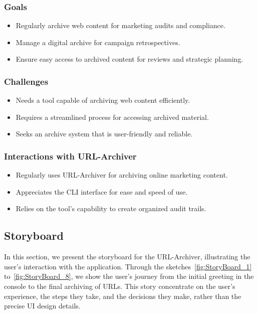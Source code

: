 \subsubsection{Goals}
\begin{itemize}
    \item Regularly archive web content for marketing audits and compliance.
    \item Manage a digital archive for campaign retrospectives.
    \item Ensure easy access to archived content for reviews and strategic planning.
\end{itemize}

\subsubsection{Challenges}
\begin{itemize}
    \item Needs a tool capable of archiving web content efficiently.
    \item Requires a streamlined process for accessing archived material.
    \item Seeks an archive system that is user-friendly and reliable.
\end{itemize}

\subsubsection{Interactions with URL-Archiver}
\begin{itemize}
    \item Regularly uses URL-Archiver for archiving online marketing content.
    \item Appreciates the CLI interface for ease and speed of use.
    \item Relies on the tool's capability to create organized audit trails.
\end{itemize}


\subsection{Storyboard}
In this section, we present the storyboard for the URL-Archiver, illustrating the user's interaction with the application.
Through the sketches~\ref{fig:StoryBoard_1} to~\ref{fig:StoryBoard_8}, we show the user's journey from the initial greeting in the console to the final archiving of URLs.
This story concentrate on the user's experience, the steps they take, and the decisions they make, rather than the precise UI design details.

